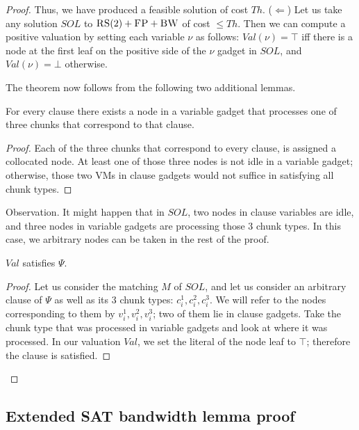 \documentclass[9pt]{sigcomm-alternate}
\newcommand{\variab}{\nu}
\newcommand{\achunk}{\ensuremath{c}}
\newcommand{\FP}{\textsc{FP}}
\newcommand{\RS}{\textsc{RS}}
\newcommand{\BW}{\textsc{BW}}
\newcommand{\Formula}{\ensuremath{\Psi}}
\newcommand{\Thr}{\ensuremath{Th}}
\newcommand{\Val}{\ensuremath{Val}}
\newcommand{\Sol}{\ensuremath{SOL}}
\begin{document}
\begin{appendix}
\begin{proof}
Thus, we have produced a feasible solution of cost $\Thr$.
($\Leftarrow$)
Let us take any solution $\Sol$ to $\RS(2)+\FP+\BW$ of cost $\leq \Thr$.
Then we can compute a positive valuation by setting each variable $\variab$
as follows:
$\Val(\variab)= \top$ iff there is a node at the first leaf on the positive side of the $\variab$ gadget in $\Sol$,
and $\Val(\variab)=\bot$ otherwise.


The theorem now follows from the following two additional lemmas.
\begin{lemma}
For every clause there exists a node in a variable gadget that processes one of
  three chunks that correspond to that clause.
\end{lemma}
\begin{proof}
 Each of the three chunks that correspond to every clause,
 is assigned a collocated node.
 At least one of those three nodes is not idle in a variable gadget;
otherwise, those two VMs in clause gadgets would not suffice in
satisfying all chunk types.
\end{proof}

Observation. It might happen that in $\Sol$, two nodes in
clause variables are idle, and three nodes in variable gadgets are
processing those $3$ chunk types. In this case, we
arbitrary nodes can be taken in the rest
of the proof.

\begin{lemma}
$\Val$ satisfies $\Formula$.
\end{lemma}
\begin{proof}
Let us consider the matching $M$ of $\Sol$, and let us consider an arbitrary clause of
$\Formula$ as well as its $3$ chunk types: $\achunk_i^1, \achunk_i^2, \achunk_i^3$.
We will refer to the nodes corresponding to them
by $v_i^1, v_i^2, v_i^3$; two of them lie in clause gadgets.
Take the chunk type that was processed in variable
gadgets and look at where it was processed.
In our valuation $\Val$, we set the literal of the node leaf to
$\top$; therefore the clause is satisfied.
\end{proof}
\end{proof}


\subsection{Extended SAT bandwidth lemma proof}


\end{appendix}
\end{document}
